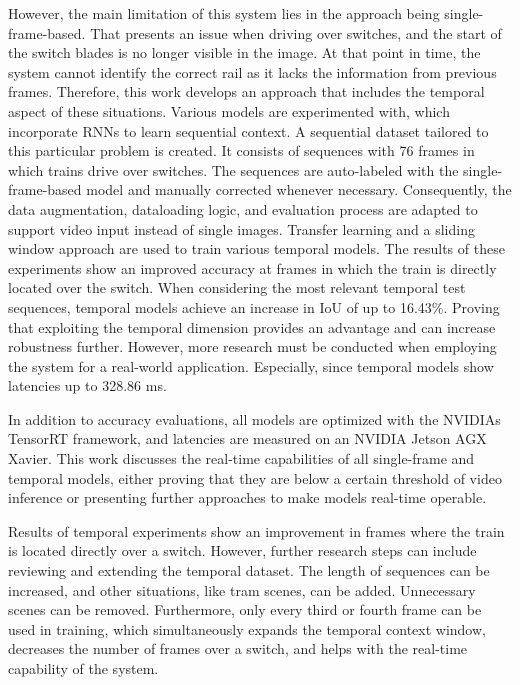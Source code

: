 However, the main limitation of this system lies in the approach being single-frame-based.
That presents an issue when driving over switches, and the start of the switch blades is no longer visible in the image.
At that point in time, the system cannot identify the correct rail as it lacks the information from previous frames.
Therefore, this work develops an approach that includes the temporal aspect of these situations.
Various models are experimented with, which incorporate \ac{RNN}s to learn sequential context.
A sequential dataset tailored to this particular problem is created.
It consists of sequences with 76 frames in which trains drive over switches.
The sequences are auto-labeled with the single-frame-based model and manually corrected whenever necessary.
Consequently, the data augmentation, dataloading logic, and evaluation process are adapted to support video input instead of single images.
Transfer learning and a sliding window approach are used to train various temporal models.
The results of these experiments show an improved accuracy at frames in which the train is directly located over the switch.
When considering the most relevant temporal test sequences, temporal models achieve an increase in \ac{IoU} of up to 16.43\%.
Proving that exploiting the temporal dimension provides an advantage and can increase robustness further.
However, more research must be conducted when employing the system for a real-world application.
Especially, since temporal models show latencies up to 328.86 ms.

In addition to accuracy evaluations, all models are optimized with the NVIDIAs TensorRT framework, and latencies are measured on an NVIDIA Jetson AGX Xavier.
This work discusses the real-time capabilities of all single-frame and temporal models, either proving that they are below a certain threshold of video inference or presenting further approaches to make models real-time operable.

\vspace{2cm}

\noindent Results of temporal experiments show an improvement in frames where the train is located directly over a switch.
However, further research steps can include reviewing and extending the temporal dataset.
The length of sequences can be increased, and other situations, like tram scenes, can be added.
Unnecessary scenes can be removed.
Furthermore, only every third or fourth frame can be used in training, which simultaneously expands the temporal context window, decreases the number of frames over a switch, and helps with the real-time capability of the system.

